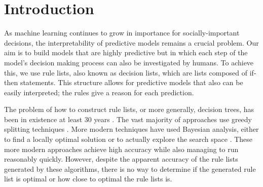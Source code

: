 %
%
%
%
%
%

\section{Introduction}

As machine learning continues to grow in importance for socially-important decisions, the interpretability of predictive models remains a crucial problem. Our aim is to build models that are highly predictive but in which each step of the model's decision making process can also be investigated by humans. To achieve this, we use rule lists, also known as decision lists, which are lists composed of if-then statements. This structure allows for predictive models that also can be easily interpreted; the rules give a reason for each prediction.

The problem of how to construct rule lists, or more generally, decision trees, has been in existence at least 30 years \cite{Rivest87,CART,C5.0}. The vast majority of approaches use greedy splitting techniques \cite{Rivest87,CART,C5.0,etc}. More modern techniques have used Bayesian analysis, either to find a locally optimal solution \cite{BART} or to actually explore the search space \citep{LethamRuMcMa15, YangRuSe16}. These more modern approaches achieve high accuracy while also managing to run reasonably quickly. However, despite the apparent accuracy of the rule lists generated by these algorithms, there is no way to determine if the generated rule list is optimal or how close to optimal the rule lists is.

